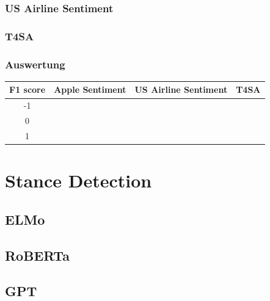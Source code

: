 \subsubsection*{US Airline Sentiment}

\subsubsection*{T4SA}

\subsubsection*{Auswertung}
\begin{center}
\begin{tabular}{|c||c|c|c|}
\hline
F1 score & Apple Sentiment & US Airline Sentiment & T4SA\\ 
\hline\hline
-1 &  &  & \\
\hline
0 &  &  & \\ 
\hline
1 &  &  & \\
\hline    
\end{tabular}
\end{center}

\section{Stance Detection}

\subsection{ELMo}

\subsection{RoBERTa}

\subsection{GPT}
